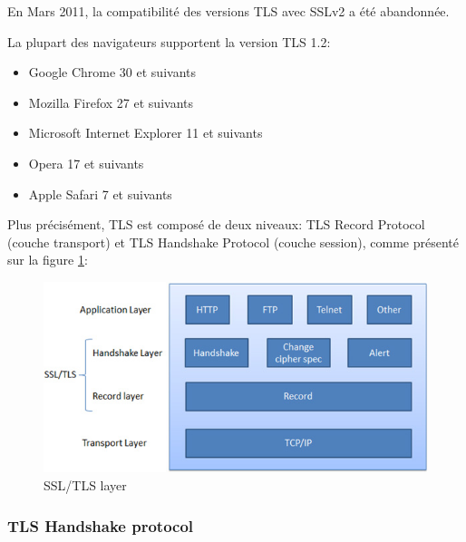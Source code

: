  En Mars 2011, la compatibilité des versions TLS avec SSLv2 a été abandonnée. %

La plupart des navigateurs supportent la version TLS 1.2:
\begin{itemize}
\item Google Chrome 30 et suivants
\item Mozilla Firefox 27 et suivants
\item Microsoft Internet Explorer 11 et suivants
\item Opera 17 et suivants
\item Apple Safari 7 et suivants
\end{itemize}

Plus précisément, TLS est composé de deux niveaux: TLS Record Protocol (couche transport) et TLS Handshake Protocol (couche session), comme présenté sur la figure \ref{ssl-tls-diag}: \\

\begin{figure}[H]
  \centering
  \includegraphics[scale=0.5]{img/ssl-tls-diag.jpg}
  \caption{SSL/TLS layer}
  \label{ssl-tls-diag}
\end{figure}  


\subsubsection{TLS Handshake protocol}

